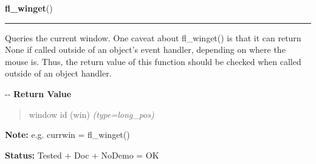 \hspace{.8\funcindent}\begin{boxedminipage}{\funcwidth}

    \raggedright \textbf{fl\_winget}()

    \vspace{-1.5ex}

    \rule{\textwidth}{0.5\fboxrule}
\setlength{\parskip}{2ex}

Queries the current window. One caveat about fl\_winget() is that it
can return None if called outside of an object's event handler, depending
on where the mouse is. Thus, the return value of this function should be
checked when called outside of an object handler.

-{}-
\setlength{\parskip}{1ex}
      \textbf{Return Value}
    \vspace{-1ex}

      \begin{quote}

window id (win)
      {\it (type=long\_pos)}

      \end{quote}

\textbf{Note:} 
e.g. currwin = fl\_winget()


\textbf{Status:} 
Tested + Doc + NoDemo = OK


    \end{boxedminipage}

    \label{xformslib:flxbasic:fl_iconify}

    \vspace{0.5ex}

